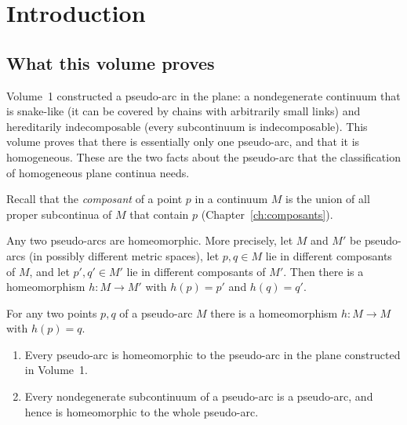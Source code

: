 \chapter{Introduction}\label{ch:intro}

\section{What this volume proves}

Volume~1 constructed a pseudo-arc in the plane: a nondegenerate continuum that is snake-like
(it can be covered by chains with arbitrarily small links) and hereditarily indecomposable
(every subcontinuum is indecomposable). This volume proves that there is essentially only one
pseudo-arc, and that it is homogeneous. These are the two facts about the pseudo-arc that the
classification of homogeneous plane continua needs.

Recall that the \emph{composant} of a point $p$ in a continuum $M$ is the union of all proper
subcontinua of $M$ that contain $p$ (Chapter~\ref{ch:composants}).

\begin{theorem}\label{thm:intro-unique}
Any two pseudo-arcs are homeomorphic. More precisely, let $M$ and $M'$ be pseudo-arcs (in
possibly different metric spaces), let $p,q\in M$ lie in different composants of $M$, and let
$p',q'\in M'$ lie in different composants of $M'$. Then there is a homeomorphism $h\colon M\to
M'$ with $h(p)=p'$ and $h(q)=q'$.
\end{theorem}

\begin{theorem}\label{thm:intro-homog}
For any two points $p,q$ of a pseudo-arc $M$ there is a homeomorphism $h\colon M\to M$ with
$h(p)=q$.
\end{theorem}

\begin{corollary}\label{cor:intro}
\begin{enumerate}[label=(\alph*)]
\item Every pseudo-arc is homeomorphic to the pseudo-arc in the plane constructed in
Volume~1.
\item Every nondegenerate subcontinuum of a pseudo-arc is a pseudo-arc, and hence is
homeomorphic to the whole pseudo-arc.
\end{enumerate}
\end{corollary}

